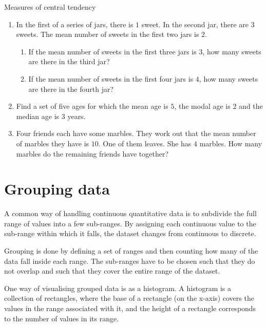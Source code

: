 \begin{exercises}{Measures of central tendency}
\begin{enumerate}

\item In the first of a series of jars, there is $1$ sweet. In the
  second jar, there are $3$ sweets. The mean number of sweets in the
  first two jars is $2$.
  \begin{enumerate}
  \item If the mean number of sweets in the first three jars is $3$, how
    many sweets are there in the third jar?
  \item If the mean number of sweets in the first four jars is $4$, how
    many sweets are there in the fourth jar?
  \end{enumerate}

\item Find a set of five ages for which the mean age is $5$, the modal
  age is $2$ and the median age is $3$ years.

\item Four friends each have some marbles. They work out that the mean
  number of marbles they have is $10$. One of them leaves. She has $4$
  marbles. How many marbles do the remaining friends have together?

\end{enumerate}
\end{exercises}

\section{Grouping data}
\label{sec:statistics_grouping_data}
A common way of handling continuous quantitative data is to subdivide
the full range of values into a few sub-ranges.
By assigning each continuous value to the sub-range within which it
falls, the dataset changes from continuous to discrete.

Grouping is done by defining a set of ranges and then counting how
many of the data fall inside each range. The sub-ranges have to be chosen
such that they do not overlap and such that they cover the entire
range of the dataset.

One way of visualising grouped data is as a histogram. A histogram is
a collection of rectangles, where the base of a rectangle (on the
x-axis) covers the values in the range associated with it, and the
height of a rectangle corresponds to the number of values in its
range.

